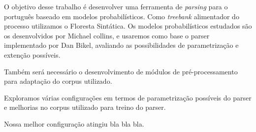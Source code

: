 \documentclass[a4paper]{abnt}
\begin{document}


\pagestyle{plain}


\begin{resumo}

O objetivo desse trabalho é desenvolver uma ferramenta de \emph{parsing} para o português baseado em modelos probabilísticos. Como \emph{treebank} alimentador do processo utilizamos o Floresta Sintática. Os modelos probabilísticos estudados são os desenvolvidos por Michael collins, e usaremos como base o parser implementado por Dan Bikel, avaliando as possibilidades de parametrização e extenção possíveis. 

Também será necessário o desenvolvimento de módulos de pré-processamento para adaptação do corpus utilizado.

Exploramos várias configurações em termos de parametrização possíveis do parser e melhorias no corpus utilizado para treino do parser.

Nossa melhor configuração atingiu bla bla bla. 

\end{resumo}








%
%

\setcounter{page}{1}


%    

%	

%	
\end{document}
